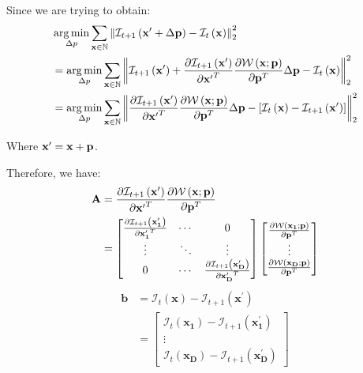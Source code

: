 \documentclass[11pt]{article} \usepackage{fullpage} \usepackage{graphicx} \usepackage{epstopdf} \usepackage{color} \usepackage{psfrag} \usepackage{pdfsync}\usepackage{indentfirst}\usepackage{subfigure}\usepackage{float}\usepackage[section]{placeins}
\begin{document}
Since we are trying to obtain:
\begin{align}
	& \mathop{\arg\min}_{\Delta{p}} \sum_{\mathbf{x} \in \mathbb{N}} \left \| \mathcal{I}_{t+1}\left( \mathbf{x^\prime} + \Delta{\mathbf{p}} \right) - \mathcal{I}_{t}\left( \mathbf{x} \right) \right \|_{2}^{2} \\
	& = \mathop{\arg\min}_{\Delta{p}} \sum_{\mathbf{x} \in \mathbb{N}} \left \| \mathcal{I}_{t+1}\left( \mathbf{x^\prime} \right) + \frac{\partial{\mathcal{I}_{t+1}\left( \mathbf{x^\prime} \right)}}{\partial{\bold{x^\prime}^{T}}}\frac{\partial{\mathcal{W}\left(\bold{x}; \bold{p}\right)}}{\partial{\bold{p}^{T}}}\Delta{\mathbf{p}} - \mathcal{I}_{t}\left( \mathbf{x} \right) \right \|_{2}^{2} \\
	& = \mathop{\arg\min}_{\Delta{p}} \sum_{\mathbf{x} \in \mathbb{N}} \left \| \frac{\partial{\mathcal{I}_{t+1}\left( \mathbf{x^\prime} \right)}}{\partial{\bold{x^\prime}^{T}}}\frac{\partial{\mathcal{W}\left(\bold{x}; \bold{p}\right)}}{\partial{\bold{p}^{T}}}\Delta{\mathbf{p}} - \left[\mathcal{I}_{t}\left( \mathbf{x} \right) - \mathcal{I}_{t+1}\left( \mathbf{x^\prime} \right) \right] \right \|_{2}^{2}
\end{align}

Where $\bold{x^\prime} = \bold{x} + \bold{p}$.

Therefore, we have:
\begin{align}
	\mathbf{A} & = \frac{\partial{\mathcal{I}_{t+1}\left( \mathbf{x^\prime} \right)}}{\partial{\bold{x^\prime}^{T}}}\frac{\partial{\mathcal{W}\left(\bold{x}; \bold{p}\right)}}{\partial{\bold{p}^{T}}} \\
	& = \begin{bmatrix}
	\frac{\partial{\mathcal{I}_{t+1}\left( \mathbf{x_{1}^\prime} \right)}}{\partial{\bold{x_{1}^\prime}^{T}}} & \cdots & 0 \\
	\vdots & \ddots & \vdots \\
	0 & \cdots & \frac{\partial{\mathcal{I}_{t+1}\left( \mathbf{x_{D}^\prime} \right)}}{\partial{\bold{x_{D}^\prime}^{T}}}
	\end{bmatrix} \begin{bmatrix}
	\frac{\partial{\mathcal{W}\left(\bold{x_1}; \bold{p}\right)}}{\partial{\bold{p}^{T}}} \\ \vdots \\ \frac{\partial{\mathcal{W}\left(\bold{x_D}; \bold{p}\right)}}{\partial{\bold{p}^{T}}}
	\end{bmatrix}
\end{align}
\begin{align}
	\mathbf{b} & = \mathcal{I}_{t}\left( \mathbf{x} \right) - \mathcal{I}_{t+1}\left( \mathbf{x^\prime} \right) \\
	& = \begin{bmatrix}
	\mathcal{I}_{t}\left( \mathbf{x_1} \right) - \mathcal{I}_{t+1}\left( \mathbf{x_1^\prime} \right) \\ \vdots \\ \mathcal{I}_{t}\left( \mathbf{x_D} \right) - \mathcal{I}_{t+1}\left( \mathbf{x_D^\prime} \right)
	\end{bmatrix}
\end{align}
\end{document}
